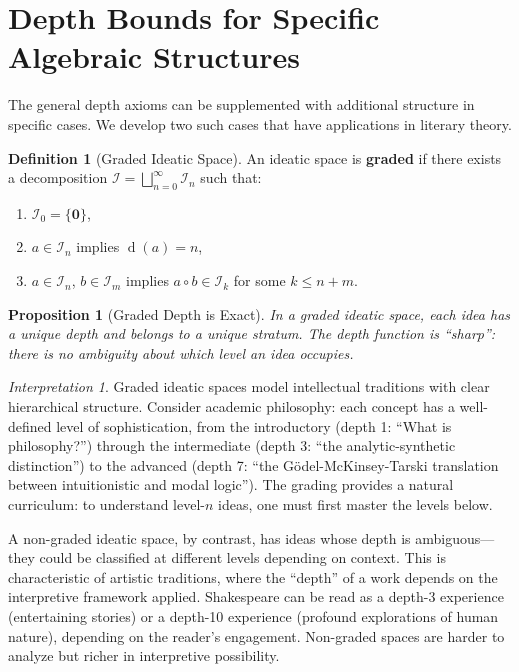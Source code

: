 \documentclass[11pt,openany]{book}
\theoremstyle{definition}
\newtheorem{definition}[axiom]{Definition}
\theoremstyle{plain}
\newtheorem{proposition}[axiom]{Proposition}
\theoremstyle{remark}
\newtheorem{interpretation}[axiom]{Interpretation}
\newcommand{\IS}{\mathcal{I}}               %
\newcommand{\compose}{\circ}                 %
\newcommand{\void}{\mathbf{0}}              %
\newcommand{\depth}{\operatorname{d}}       %
\begin{document}
\section{Depth Bounds for Specific Algebraic Structures}

The general depth axioms can be supplemented with additional structure in specific cases. We develop two such cases that have applications in literary theory.

\begin{definition}[Graded Ideatic Space]
An ideatic space is \textbf{graded} if there exists a decomposition $\IS = \bigsqcup_{n=0}^{\infty} \IS_n$ such that:
\begin{enumerate}
\item $\IS_0 = \{\void\}$,
\item $a \in \IS_n$ implies $\depth(a) = n$,
\item $a \in \IS_n$, $b \in \IS_m$ implies $a \compose b \in \IS_k$ for some $k \leq n + m$.
\end{enumerate}
\end{definition}

\begin{proposition}[Graded Depth is Exact]
In a graded ideatic space, each idea has a unique depth and belongs to a unique stratum. The depth function is ``sharp'': there is no ambiguity about which level an idea occupies.
\end{proposition}

\begin{interpretation}
Graded ideatic spaces model intellectual traditions with clear hierarchical structure. Consider academic philosophy: each concept has a well-defined level of sophistication, from the introductory (depth 1: ``What is philosophy?'') through the intermediate (depth 3: ``the analytic-synthetic distinction'') to the advanced (depth 7: ``the Gödel-McKinsey-Tarski translation between intuitionistic and modal logic''). The grading provides a natural curriculum: to understand level-$n$ ideas, one must first master the levels below.

A non-graded ideatic space, by contrast, has ideas whose depth is ambiguous---they could be classified at different levels depending on context. This is characteristic of artistic traditions, where the ``depth'' of a work depends on the interpretive framework applied. Shakespeare can be read as a depth-3 experience (entertaining stories) or a depth-10 experience (profound explorations of human nature), depending on the reader's engagement. Non-graded spaces are harder to analyze but richer in interpretive possibility.
\end{interpretation}
\end{document}
